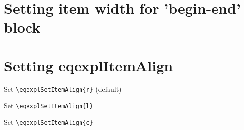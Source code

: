 \documentclass{article}
\begin{document}
\eqexplSetItemWidth{5mm}

\section{Setting item width for 'begin-end' block}

\section{Setting eqexplItemAlign}

Set \verb+\eqexplSetItemAlign{r}+ (default)
\begin{eqexpl}
  \testList
\end{eqexpl}

Set \verb+\eqexplSetItemAlign{l}+
\begin{eqexpl}
  \testList
\end{eqexpl}

Set \verb+\eqexplSetItemAlign{c}+
\begin{eqexpl}
  \testList
\end{eqexpl}

\end{document}
